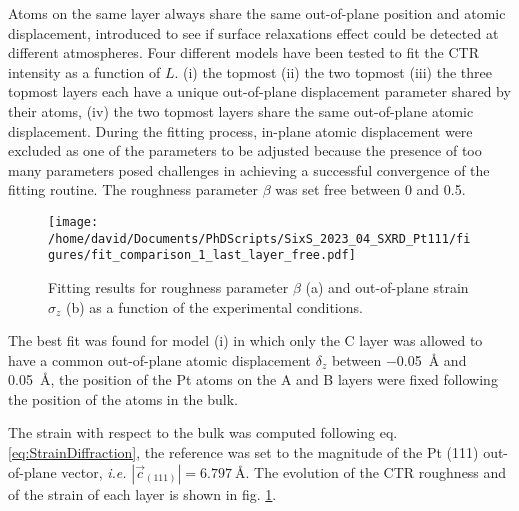 Atoms on the same layer always share the same out-of-plane position and atomic displacement, introduced to see if surface relaxations effect could be detected at different atmospheres.
Four different models have been tested to fit the CTR intensity as a function of $L$. (i) the topmost (ii) the two topmost (iii) the three topmost layers each have a unique out-of-plane displacement parameter shared by their atoms, (iv) the two topmost layers share the same out-of-plane atomic displacement.
During the fitting process, in-plane atomic displacement were excluded as one of the parameters to be adjusted because the presence of too many parameters posed challenges in achieving a successful convergence of the fitting routine.
The roughness parameter $\beta$ was set free between 0 and 0.5.%

\begin{figure}[!htb]
    \centering
    \texttt{[image: /home/david/Documents/PhDScripts/SixS\_2023\_04\_SXRD\_Pt111/figures/fit\_comparison\_1\_last\_layer\_free.pdf]}
    \caption{
        Fitting results for roughness parameter $\beta$ (a) and out-of-plane strain $\sigma_z$ (b) as a function of the experimental conditions.
    }
    \label{fig:CTRFit111}
\end{figure}

The best fit was found for model (i) in which only the C layer was allowed to have a common out-of-plane atomic displacement $\delta_z$ between \qty{-0.05}{\angstrom} and \qty{0.05}{\angstrom}, the position of the Pt atoms on the A and B layers were fixed following the position of the atoms in the bulk.

The strain with respect to the bulk was computed following eq. \ref{eq:StrainDiffraction}, the reference was set to the magnitude of the Pt (111) out-of-plane vector, \textit{i.e.} $|\vec{c}_{(111)}| = \qty{6.797}{\angstrom}$.
The evolution of the CTR roughness and of the strain of each layer is shown in fig. \ref{fig:CTRFit111}.

